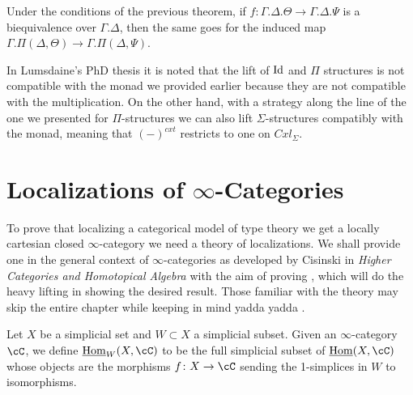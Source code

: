 \documentclass[a4paper,fontsize=12pt]{scrartcl}
\begin{document}
\begin{cor}\cite[Lemma 2.29]{1808}
  Under the conditions of the previous theorem, if
  $f\colon\Gamma.\Delta.\Theta\rightarrow\Gamma.\Delta.\Psi$ is a
  biequivalence over $\Gamma.\Delta$, then the same goes for the induced map
  $\Gamma.\Pi(\Delta,\Theta)\rightarrow\Gamma.\Pi(\Delta,\Psi)$.
\end{cor}



\begin{rmk}
  In Lumsdaine's PhD thesis it is noted that the lift of $\operatorname{Id}$ and $\Pi$
  structures is not compatible with the monad we provided earlier because they
  are not compatible with the multiplication. On the other
  hand, with a strategy along the line of the one we presented for
  $\Pi$-structures we can also lift $\Sigma$-structures compatibly with the
  monad, meaning that $(-)^{cxt}$ restricts to one on $Cxl_\Sigma$.
\end{rmk}

\section{Localizations of \texorpdfstring{$\infty$}{∞}-Categories}

To prove that localizing a categorical model of type theory we get a locally
cartesian closed $\infty$-category we need a theory of localizations. We shall
provide one in the general context of $\infty$-categories as developed by
Cisinski in \emph{Higher Categories and Homotopical Algebra} with the aim of
proving \cite[Thm.\ 7.6.16]{Cis19}, which will do the heavy lifting in showing
the desired result. Those familiar with the theory may skip the entire chapter
while keeping in mind yadda yadda .

\begin{defn}
  Let $X$ be a simplicial set and $W\subset X$ a simplicial subset. Given an
  $\infty$-category $\cC$, we define $\Home_W(X,\cC)$ to be the full simplicial
  subset of $\Home(X,\cC)$ whose objects are the morphisms $f\colon
  X\rightarrow\cC$ sending the 1-simplices in $W$ to isomorphisms.
\end{defn}
\end{document}
